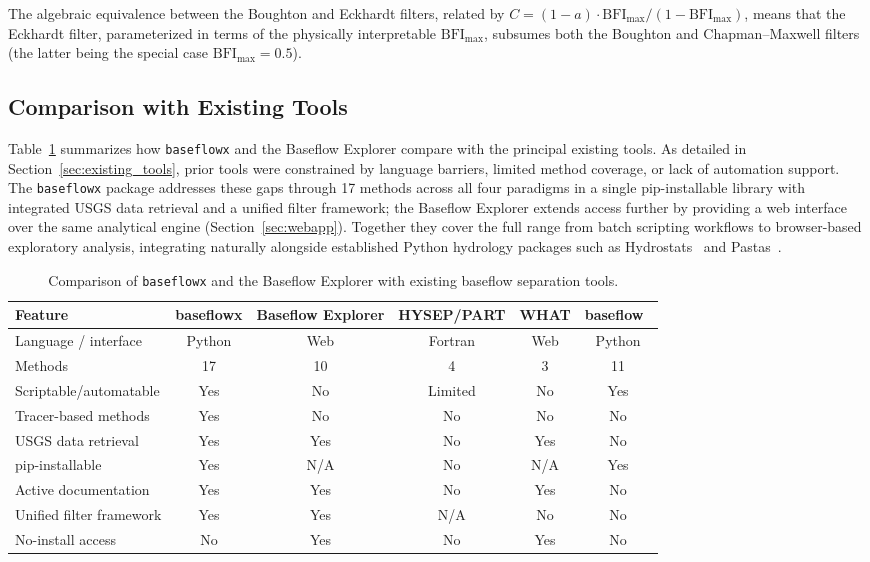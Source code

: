 \documentclass[hydrology,article,submit,pdftex,moreauthors]{Definitions/mdpi}
\begin{document}
The algebraic equivalence between the Boughton and Eckhardt filters, related by $C = (1-a)\cdot\mathrm{BFI_{max}}/(1-\mathrm{BFI_{max}})$, means that the Eckhardt filter, parameterized in terms of the physically interpretable $\mathrm{BFI_{max}}$, subsumes both the Boughton and Chapman--Maxwell filters (the latter being the special case $\mathrm{BFI_{max}} = 0.5$).

\subsection{Comparison with Existing Tools}
\label{sec:comparison_tools}

Table~\ref{tab:comparison} summarizes how \texttt{baseflowx} and the Baseflow Explorer compare with the principal existing tools. As detailed in Section~\ref{sec:existing_tools}, prior tools were constrained by language barriers, limited method coverage, or lack of automation support. The \texttt{baseflowx} package addresses these gaps through 17 methods across all four paradigms in a single pip-installable library with integrated USGS data retrieval and a unified filter framework; the Baseflow Explorer extends access further by providing a web interface over the same analytical engine (Section~\ref{sec:webapp}). Together they cover the full range from batch scripting workflows to browser-based exploratory analysis, integrating naturally alongside established Python hydrology packages such as Hydrostats~\cite{Roberts2018} and Pastas~\cite{Collenteur2019}.

\begin{table}[H]
\caption{Comparison of \texttt{baseflowx} and the Baseflow Explorer with existing baseflow separation tools.\label{tab:comparison}}
\small
\begin{tabularx}{\textwidth}{lccccc}
\toprule
\textbf{Feature} & \textbf{baseflowx} & \textbf{Baseflow Explorer} & \textbf{HYSEP/PART} & \textbf{WHAT} & \textbf{baseflow}~\cite{Xie2020} \\
\midrule
Language / interface & Python & Web & Fortran & Web & Python \\
Methods & 17 & 10 & 4 & 3 & 11 \\
Scriptable/automatable & Yes & No & Limited & No & Yes \\
Tracer-based methods & Yes & No & No & No & No \\
USGS data retrieval & Yes & Yes & No & Yes & No \\
pip-installable & Yes & N/A & No & N/A & Yes \\
Active documentation & Yes & Yes & No & Yes & No \\
Unified filter framework & Yes & Yes & N/A & No & No \\
No-install access & No & Yes & No & Yes & No \\
\bottomrule
\end{tabularx}
\end{table}
\end{document}
